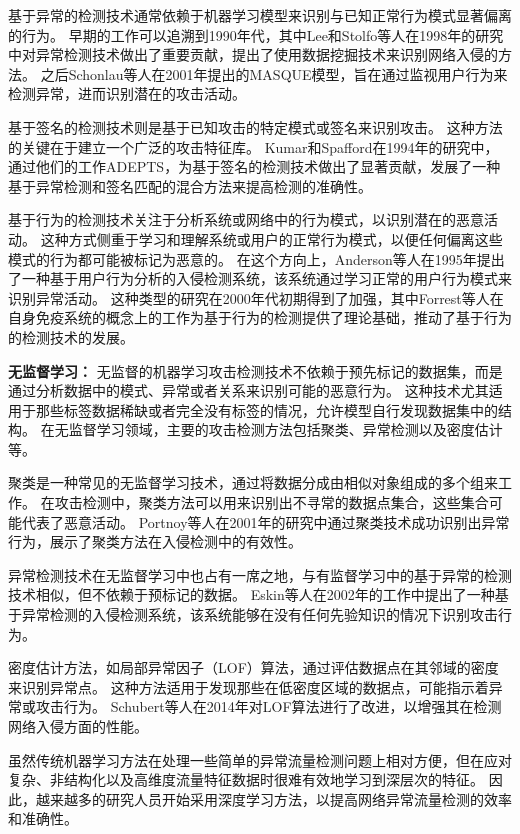 基于异常的检测技术通常依赖于机器学习模型来识别与已知正常行为模式显著偏离的行为。
早期的工作可以追溯到1990年代，其中Lee和Stolfo等人\cite{lee1998dataMining}在1998年的研究中对异常检测技术做出了重要贡献，提出了使用数据挖掘技术来识别网络入侵的方法。
之后Schonlau等人在2001年提出的MASQUE模型，旨在通过监视用户行为来检测异常，进而识别潜在的攻击活动。

基于签名的检测技术则是基于已知攻击的特定模式或签名来识别攻击。
这种方法的关键在于建立一个广泛的攻击特征库。
Kumar和Spafford\cite{kumar1994adep}在1994年的研究中，通过他们的工作ADEPTS，为基于签名的检测技术做出了显著贡献，发展了一种基于异常检测和签名匹配的混合方法来提高检测的准确性。

基于行为的检测技术关注于分析系统或网络中的行为模式，以识别潜在的恶意活动。
这种方式侧重于学习和理解系统或用户的正常行为模式，以便任何偏离这些模式的行为都可能被标记为恶意的。
在这个方向上，Anderson等人\cite{anderson1995userBehavior}在1995年提出了一种基于用户行为分析的入侵检测系统，该系统通过学习正常的用户行为模式来识别异常活动。
这种类型的研究在2000年代初期得到了加强，其中Forrest等人\cite{forrest1996selfImmune}在自身免疫系统的概念上的工作为基于行为的检测提供了理论基础，推动了基于行为的检测技术的发展。


\textbf{无监督学习：}
无监督的机器学习攻击检测技术不依赖于预先标记的数据集，而是通过分析数据中的模式、异常或者关系来识别可能的恶意行为。
这种技术尤其适用于那些标签数据稀缺或者完全没有标签的情况，允许模型自行发现数据集中的结构。
在无监督学习领域，主要的攻击检测方法包括聚类、异常检测以及密度估计等。

聚类是一种常见的无监督学习技术，通过将数据分成由相似对象组成的多个组来工作。
在攻击检测中，聚类方法可以用来识别出不寻常的数据点集合，这些集合可能代表了恶意活动。
Portnoy等人\cite{portnoy2001clustering}在2001年的研究中通过聚类技术成功识别出异常行为，展示了聚类方法在入侵检测中的有效性。

异常检测技术在无监督学习中也占有一席之地，与有监督学习中的基于异常的检测技术相似，但不依赖于预标记的数据。
Eskin等人\cite{eskin2002anomaly}在2002年的工作中提出了一种基于异常检测的入侵检测系统，该系统能够在没有任何先验知识的情况下识别攻击行为。

密度估计方法，如局部异常因子（LOF）算法，通过评估数据点在其邻域的密度来识别异常点。
这种方法适用于发现那些在低密度区域的数据点，可能指示着异常或攻击行为。
Schubert等人\cite{schubert2014local}在2014年对LOF算法进行了改进，以增强其在检测网络入侵方面的性能。

虽然传统机器学习方法在处理一些简单的异常流量检测问题上相对方便，但在应对复杂、非结构化以及高维度流量特征数据时很难有效地学习到深层次的特征。
因此，越来越多的研究人员开始采用深度学习方法，以提高网络异常流量检测的效率和准确性。

